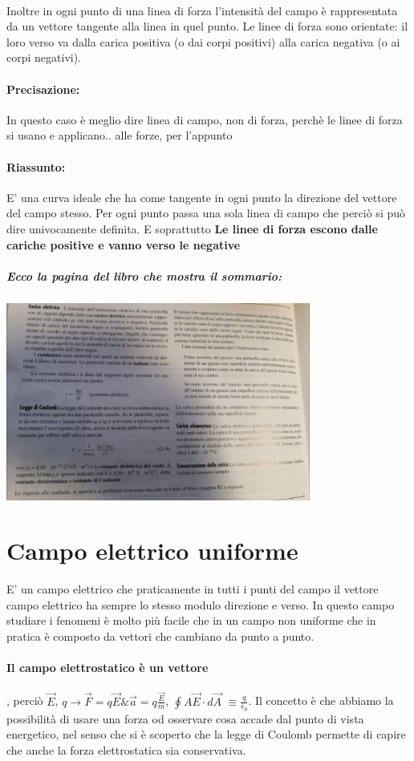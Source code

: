 \documentclass[12pt, a4paper, openany, oneside]{book}
\begin{document}
\paragraph{}Inoltre in ogni punto di una linea di forza l'intensità del campo
è rappresentata da un vettore tangente alla linea in quel punto. Le linee di
forza sono orientate: il loro verso va dalla carica positiva (o dai corpi
positivi) alla carica negativa (o ai corpi negativi).
\paragraph{Precisazione: }In questo caso è meglio dire linea di campo, non
di forza, perchè le linee di forza si usano e applicano.. alle forze, per 
l'appunto
\paragraph{Riassunto: }E' una curva ideale che ha come tangente in ogni punto la
direzione del vettore del campo stesso. Per ogni punto passa una sola linea di 
campo che perciò si può dire univocamente definita. E soprattutto \textbf{Le
linee di forza escono dalle cariche positive e vanno verso le negative}
\subparagraph{Ecco la pagina del libro che mostra il sommario:}
\begin{center}
	\includegraphics[width=0.75\textwidth]{20}
\end{center}	
\section{Campo elettrico uniforme}
E' un campo elettrico che praticamente in tutti i punti del campo il vettore 
campo elettrico ha sempre lo stesso modulo direzione e verso. In questo campo
studiare i fenomeni è molto più facile che in un campo non uniforme che in
pratica è composto da vettori che cambiano da punto a punto.
\paragraph{Il campo elettrostatico è un vettore}, perciò $\overrightarrow{E}$, 
$q \to \overrightarrow{F} = q \overrightarrow{E} \& \overrightarrow{a} = q 
\frac{\overrightarrow{E}}{m}$, $\oint{A} \overrightarrow{E} \cdot d \overrightarrow{A}$
$\equiv \frac{q}{\epsilon_{0}}$. Il concetto è che abbiamo la possibilità di 
usare una forza od osservare cosa accade dal punto di vista energetico, nel 
senso che si è scoperto che la legge di Coulomb permette di capire che anche la
forza elettrostatica sia conservativa.
\end{document}
